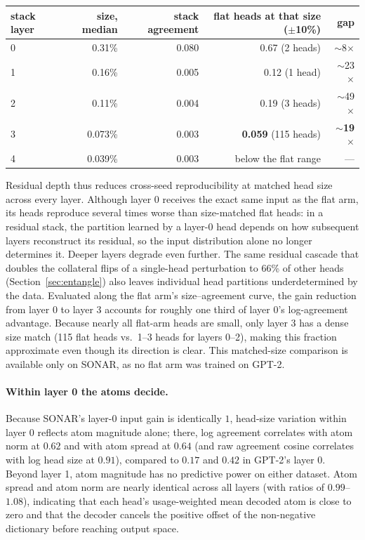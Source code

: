 \begin{center}\small
\begin{tabular}{@{}lrrrr@{}}
\toprule
stack layer & size, median & stack agreement & flat heads at that size ($\pm$10\%) & gap \\
\midrule
0 & 0.31\% & 0.080 & 0.67 (2 heads) & $\sim$8$\times$ \\
1 & 0.16\% & 0.005 & 0.12 (1 head) & $\sim$23$\times$ \\
2 & 0.11\% & 0.004 & 0.19 (3 heads) & $\sim$49$\times$ \\
3 & 0.073\% & 0.003 & \textbf{0.059} (115 heads) & $\sim$\textbf{19}$\times$ \\
4 & 0.039\% & 0.003 & below the flat range & --- \\
\bottomrule
\end{tabular}
\end{center}

Residual depth thus reduces cross-seed reproducibility at matched head
size across every layer. Although layer 0 receives the exact same input as
the flat arm, its heads reproduce several times worse than
size-matched flat heads: in a residual stack, the partition learned by a
layer-0 head depends on how subsequent layers reconstruct its residual, so
the input distribution alone no longer determines it. Deeper layers
degrade even further. The same residual cascade that doubles the
collateral flips of a single-head perturbation to 66\% of other heads
(Section~\ref{sec:entangle}) also leaves individual head partitions
underdetermined by the data. Evaluated along the flat arm's
size--agreement curve, the gain reduction from layer 0 to layer 3 accounts
for roughly one third of layer 0's log-agreement advantage. Because nearly
all flat-arm heads are small, only layer 3 has a dense size match (115
flat heads vs.\ 1--3 heads for layers 0--2), making this fraction
approximate even though its direction is clear. This matched-size
comparison is available only on SONAR, as no flat arm was trained on
GPT-2.

\paragraph{Within layer 0 the atoms decide.} Because SONAR's layer-0
input gain is identically $1$, head-size variation within layer 0 reflects
atom magnitude alone; there, log agreement correlates with atom norm at
$0.62$ and with atom spread at $0.64$ (and raw agreement cosine correlates
with log head size at $0.91$), compared to $0.17$ and $0.42$ in GPT-2's
layer 0. Beyond layer 1, atom magnitude has no predictive power on either
dataset. Atom spread and atom norm are nearly identical across all layers
(with ratios of $0.99$--$1.08$), indicating that each head's
usage-weighted mean decoded atom is close to zero and that the decoder
cancels the positive offset of the non-negative dictionary before reaching
output space.

